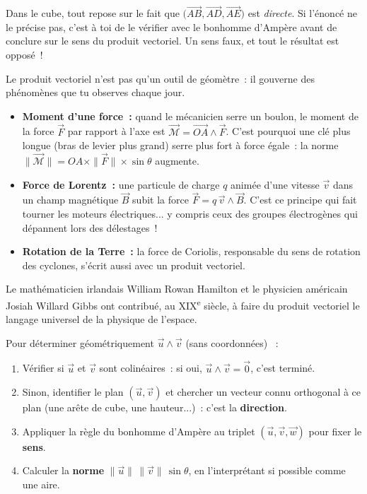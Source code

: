 \documentclass[11pt]{article}
\begin{document}
\begin{attention}
Dans le cube, tout repose sur le fait que $\bigl(\overrightarrow{AB},\overrightarrow{AD},\overrightarrow{AE}\bigr)$ est \emph{directe}. Si l'énoncé ne le précise pas, c'est à toi de le vérifier avec le bonhomme d'Ampère avant de conclure sur le sens du produit vectoriel. Un sens faux, et tout le résultat est opposé~!
\end{attention}

\begin{savaistu}
Le produit vectoriel n'est pas qu'un outil de géomètre~: il gouverne des phénomènes que tu observes chaque jour.
\begin{itemize}
\item \textbf{Moment d'une force~:} quand le mécanicien serre un boulon, le moment de la force $\vec{F}$ par rapport à l'axe est $\vec{\mathcal{M}} = \overrightarrow{OA}\wedge\vec{F}$. C'est pourquoi une clé plus longue (bras de levier plus grand) serre plus fort à force égale~: la norme $\|\vec{\mathcal{M}}\| = OA\times\|\vec{F}\|\times\sin\theta$ augmente.
\item \textbf{Force de Lorentz~:} une particule de charge $q$ animée d'une vitesse $\vec{v}$ dans un champ magnétique $\vec{B}$ subit la force $\vec{F} = q\,\vec{v}\wedge\vec{B}$. C'est ce principe qui fait tourner les moteurs électriques... y compris ceux des groupes électrogènes qui dépannent lors des délestages~!
\item \textbf{Rotation de la Terre~:} la force de Coriolis, responsable du sens de rotation des cyclones, s'écrit aussi avec un produit vectoriel.
\end{itemize}
Le mathématicien irlandais William Rowan Hamilton et le physicien américain Josiah Willard Gibbs ont contribué, au XIX\textsuperscript{e} siècle, à faire du produit vectoriel le langage universel de la physique de l'espace.
\end{savaistu}

\begin{methode}
Pour déterminer géométriquement $\vec{u}\wedge\vec{v}$ (sans coordonnées) ~:
\begin{enumerate}
\item Vérifier si $\vec{u}$ et $\vec{v}$ sont colinéaires~: si oui, $\vec{u}\wedge\vec{v}=\vec{0}$, c'est terminé.
\item Sinon, identifier le plan $(\vec{u},\vec{v})$ et chercher un vecteur connu orthogonal à ce plan (une arête de cube, une hauteur...)~: c'est la \textbf{direction}.
\item Appliquer la règle du bonhomme d'Ampère au triplet $(\vec{u},\vec{v},\vec{w})$ pour fixer le \textbf{sens}.
\item Calculer la \textbf{norme} $\|\vec{u}\|\,\|\vec{v}\|\,\sin\theta$, en l'interprétant si possible comme une aire.
\end{enumerate}
\end{methode}
\end{document}

